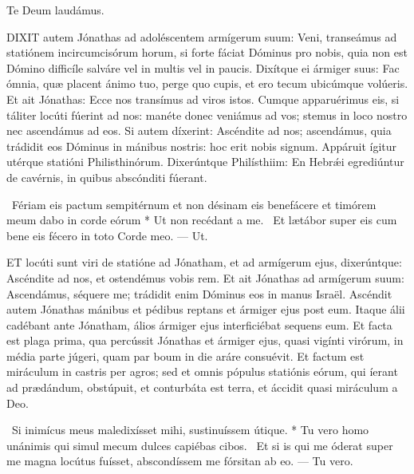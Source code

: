 Te Deum laudámus.






\lettrine[lines=2]{D}{IXIT} autem Jónathas ad adoléscentem armígerum suum: Veni, transeámus ad statiónem incircumcisórum horum, si forte fáciat Dóminus pro nobis, quia non est Dómino difficíle salváre vel in multis vel in paucis. Dixítque ei ármiger suus: Fac ómnia, quæ placent ánimo tuo, perge quo cupis, et ero tecum ubicúmque volúeris. Et ait Jónathas: Ecce nos transímus ad viros istos. Cumque apparuérimus eis, si táliter locúti fúerint ad nos: manéte donec veniámus ad vos; stemus in loco nostro nec ascendámus ad eos. Si autem díxerint: Ascéndite ad nos; ascendámus, quia trádidit eos Dóminus in mánibus nostris: hoc erit nobis signum. Appáruit ígitur utérque statióni Philisthinórum. Dixerúntque Philísthiim: En Hebrǽi egrediúntur de cavérnis, in quibus abscónditi fúerant.

\R\ Fériam eis pactum sempitérnum et non désinam eis benefácere et timórem meum dabo in corde eórum * Ut non recédant a me. \V\ Et lætábor super eis cum bene eis fécero in toto Corde meo. --- Ut.


\lettrine[lines=2]{E}{T} locúti sunt viri de statióne ad Jónatham, et ad armígerum ejus, dixerúntque: Ascéndite ad nos, et ostendémus vobis rem. Et ait Jónathas ad armígerum suum: Ascendámus, séquere me; trádidit enim Dóminus eos in manus Israël. Ascéndit autem Jónathas mánibus et pédibus reptans et ármiger ejus post eum. Itaque álii cadébant ante Jónatham, álios ármiger ejus interficiébat sequens eum. Et facta est plaga prima, qua percússit Jónathas et ármiger ejus, quasi vigínti virórum, in média parte júgeri, quam par boum in die aráre consuévit. Et factum est miráculum in castris per agros; sed et omnis pópulus statiónis eórum, qui íerant ad prædándum, obstúpuit, et conturbáta est terra, et áccidit quasi miráculum a Deo.

\R\ Si inimícus meus maledixísset mihi, sustinuíssem útique. * Tu vero homo unánimis qui simul mecum dulces capiébas cibos. \V\ Et si is qui me óderat super me magna locútus fuísset, abscondíssem me fórsitan ab eo. --- Tu vero.

